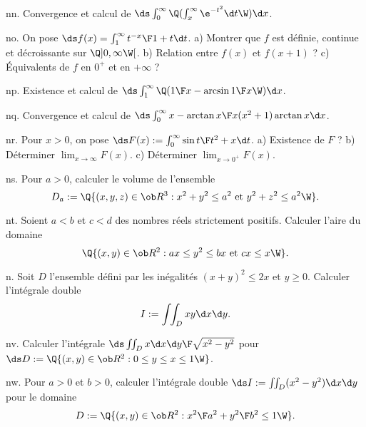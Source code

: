 \exo [Level=2,Fight=1,Learn=1,Type=\Exercices,Field=\IntégralesGénéralisées|\IntégralesMultiples,Origin=] nn. 
Convergence et calcul de $\ds \int_0^\infty\Q(\int_x^\infty\e^{-t^2}\d t\W)\d x$. 

\exo [Level=2,Fight=1,Learn=1,Type=\Exercices,Field=\FonctionsDéfiniesParUneIntégrale,Origin=] no. 
On pose $\ds f(x)=\int_1^\infty{t^{-x}\F1+t}\d t$. \pn 
a) Montrer que $f$ est définie, continue et décroissante sur $\Q]0,\infty\W[$. \pn
b) Relation entre $f(x)$ et $f(x+1)$ ? \pn
c) \'Equivalents de $f$ en $0^+$ et en $+\infty$ ? 

\exo [Level=2,Fight=1,Learn=1,Type=\Exercices,Field=\IntégralesGénéralisées,Origin=] np. 
Existence et calcul de $\ds\int_1^\infty\Q({1\F x}-\arcsin{1\F x}\W)\d x$. 

\exo [Level=2,Fight=1,Learn=1,Type=\Exercices,Field=\IntégralesGénéralisées,Origin=] nq. 
Convergence et calcul de $\ds\int_0^\infty{x-\arctan x\F x(x^2+1)\arctan x}\d x$. 

\exo [Level=2,Fight=1,Learn=1,Type=\Exercices,Field=\FonctionsDéfiniesParUneIntégrale,Origin=] nr. 
Pour $x>0$, on pose $\ds F(x):=\int_0^\infty{\sin t\F t^2+x}\d t$. \pn
a) Existence de $F$ ? \pn
b) Déterminer $\lim_{x\to\infty}F(x)$. \pn
c) Déterminer $\lim_{x\to0^+}F(x)$.  

\exo [Level=2,Fight=1,Learn=1,Type=\Exercices,Field=\Volumes,Origin=] ns. 
Pour $a>0$, calculer le volume de l'ensemble 
$$
D_a:=\Q\{(x,y,z)\in\ob R^3:x^2+y^2\le a^2
\hbox{ et }y^2+z^2\le a^2\W\}. 
$$ 

\exo [Level=2,Fight=1,Learn=1,Type=\Exercices,Field=\Aires,Origin=] nt. 
Soient $a<b$ et $c<d$ des nombres réels strictement positifs. 
Calculer l'aire du domaine 
$$
\Q\{(x,y)\in\ob R^2:ax\le y^2\le bx\hbox{ et }cx\le x\W\}.
$$ 

\exo [Level=2,Fight=0,Learn=0,Type=\Exercices,Field=\IntégralesMultiples,Origin=] n. 
Soit $D$ l'ensemble défini par les inégalités $(x+y)^2\le 2x$ et $y\ge0$. 
Calculer l'intégrale double 
$$
I:=\int\!\!\int_Dxy\d x\d y. 
$$

\exo [Level=2,Fight=1,Learn=1,Type=\Exercices,Field=\IntégralesMultiples,Origin=] nv. 
Calculer l'intégrale $\ds \int\!\!\int_D{x\d x\d y\F\sqrt{x^2-y^2}}$ 
pour $\ds D:=\Q\{(x,y)\in\ob R^2:0\le y\le x\le 1\W\}$.  

\exo [Level=2,Fight=1,Learn=1,Type=\Exercices,Field=\IntégralesMultiples,Origin=] nw. 
Pour $a>0$ et $b>0$, calculer l'intégrale double $\ds I:=\int\!\!\int_D(x^2-y^2)\d x\d y$ 
pour le domaine  
$$
D:=\Q\{(x,y)\in\ob R^2:{x^2\F a^2}+{y^2\F b^2}\le 1\W\}.
$$ 
 
